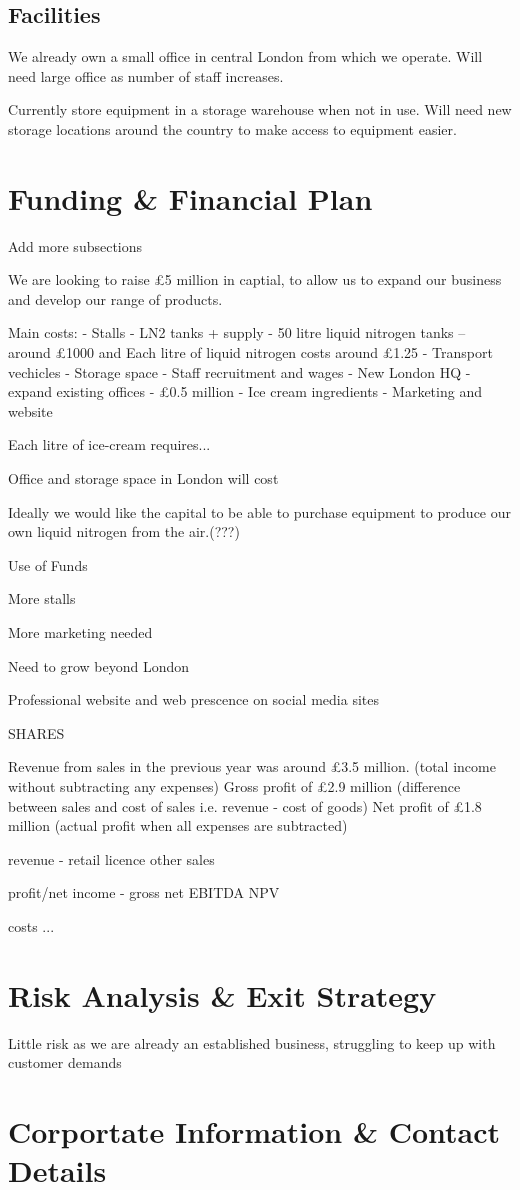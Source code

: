 \documentclass{article}
\begin{document}
  \subsection{Facilities}

  We already own a small office in central London from which we operate.
  Will need large office as number of staff increases.

  Currently store equipment in a storage warehouse when not in use.
  Will need new storage locations around the country to make access to equipment easier.


\section{Funding \& Financial Plan}
Add more subsections

We are looking to raise £5 million in captial, to allow us to expand our business and develop our range of products.

Main costs:
 - Stalls - LN2 tanks + supply - 50 litre liquid nitrogen tanks – around £1000 and Each litre of liquid nitrogen costs around £1.25
 - Transport vechicles
 - Storage space
 - Staff recruitment and wages
 - New London HQ - expand existing offices - £0.5 million
 - Ice cream ingredients
 - Marketing and website




Each litre of ice-cream requires...

Office and storage space in London will cost

Ideally we would like the capital to be able to purchase equipment to
produce our own liquid nitrogen from the air.(???)

Use of Funds

More stalls

More marketing needed

Need to grow beyond London

Professional website and web prescence on social media sites


SHARES

Revenue from sales in the previous year was around £3.5 million. (total income without subtracting any expenses) 
Gross profit of £2.9 million (difference between sales and cost of sales i.e. revenue - cost of goods)
Net profit of £1.8 million (actual profit when all expenses are subtracted)



revenue
 - retail
   licence
   other sales

profit/net income
 - gross
   net
   EBITDA
   NPV

costs
 ...

\section{Risk Analysis \& Exit Strategy}

Little risk as we are already an established business, struggling to keep up with customer demands



\section{Corportate Information \& Contact Details}
\end{document}
